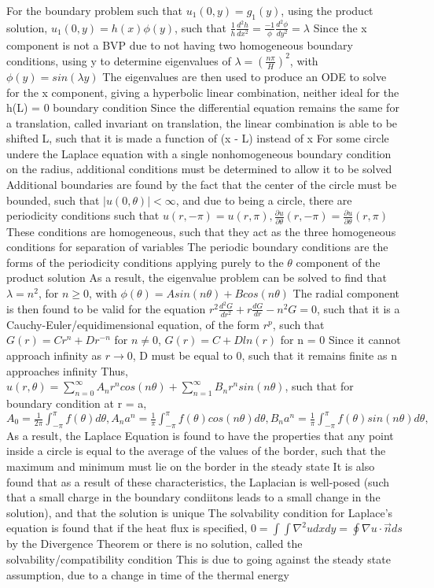 \documentclass[11 pt, twoside]{article}
\newenvironment{outline*}
{
	\begin{outline}[enumerate]
	}
	{\end{outline}
}
\begin{document}
\begin{outline*}
	\2 For the boundary problem such that $u_1(0, y) = g_1(y)$, using the product solution, $u_1(0, y) = h(x)\phi(y)$, such that $\frac{1}{h}\frac{d^2h}{dx^2} = \frac{-1}{\phi}\frac{d^2\phi}{dy^2} = \lambda$
	\2 Since the x component is not a BVP due to not having two homogeneous boundary conditions, using y to determine eigenvalues of $\lambda = (\frac{n\pi}{H})^2$, with $\phi(y) = sin(\lambda y)$
		\3 The eigenvalues are then used to produce an ODE to solve for the x component, giving a hyperbolic linear combination, neither ideal for the h(L) = 0 boundary condition
			\4 Since the differential equation remains the same for a translation, called invariant on translation, the linear combination is able to be shifted L, such that it is made a function of (x - L) instead of x
\1 For some circle undere the Laplace equation with a single nonhomogeneous boundary condition on the radius, additional conditions must be determined to allow it to be solved
	\2 Additional boundaries are found by the fact that the center of the circle must be bounded, such that $|u(0, \theta)| < \infty$, and due to being a circle, there are periodicity conditions such that $u(r, -\pi) = u(r, \pi), \frac{\partial u}{\partial \theta}(r, -\pi) = \frac{\partial u}{\partial \theta}(r, \pi)$
		\3 These conditions are homogeneous, such that they act as the three homogeneous conditions for separation of variables
		\3 The periodic boundary conditions are the forms of the periodicity conditions applying purely to the $\theta$ component of the product solution
			\4 As a result, the eigenvalue problem can be solved to find that $\lambda = n^2$, for $n \geq 0$, with $\phi(\theta) = Asin(n\theta) + Bcos(n\theta)$
		\3 The radial component is then found to be valid for the equation $r^2\frac{d^2G}{dr^2} + r\frac{dG}{dr} - n^2G = 0$, such that it is a Cauchy-Euler/equidimensional equation, of the form $r^p$, such that $G(r) = Cr^n + Dr^{-n}$ for $n \neq 0$, $G(r) = C + Dln(r)$ for n = 0
			\4 Since it cannot approach infinity as $r \to 0$, D must be equal to 0, such that it remains finite as n approaches infinity
		\3 Thus, $u(r, \theta) = \sum^{\infty}_{n = 0} A_nr^ncos(n\theta) + \sum_{n=1}^{\infty} B_nr^nsin(n\theta)$, such that for boundary condition at r = a, $A_0 = \frac{1}{2\pi}\int^{\pi}_{-\pi} f(\theta)d\theta, A_na^n = \frac{1}{\pi}\int^{\pi}_{-\pi} f(\theta)cos(n\theta)d\theta, B_na^n = \frac{1}{\pi}\int^{\pi}_{-\pi} f(\theta)sin(n\theta)d\theta,$
	\2 As a result, the Laplace Equation is found to have the properties that any point inside a circle is equal to the average of the values of the border, such that the maximum and minimum must lie on the border in the steady state
		\3 It is also found that as a result of these characteristics, the Laplacian is well-posed (such that a small charge in the boundary condiitons leads to a small change in the solution), and that the solution is unique
	\2 The solvability condition for Laplace's equation is found that if the heat flux is specified, $0 = \int\int \nabla^2 u dxdy = \oint \nabla u \cdot \vec{n} ds$ by the Divergence Theorem or there is no solution, called the solvability/compatibility condition
		\3 This is due to going against the steady state assumption, due to a change in time of the thermal energy
\end{outline*}
\end{document}
